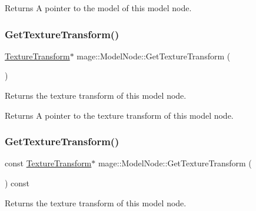 \begin{DoxyReturn}{Returns}
A pointer to the model of this model node. 
\end{DoxyReturn}
\hypertarget{classmage_1_1_model_node_aa5b732d1ad0f3d2ff8549731708fd63c}{}\label{classmage_1_1_model_node_aa5b732d1ad0f3d2ff8549731708fd63c} 
\subsubsection{\texorpdfstring{Get\+Texture\+Transform()}{GetTextureTransform()}\hspace{0.1cm}{\footnotesize\ttfamily [1/2]}}
{\footnotesize\ttfamily \hyperlink{classmage_1_1_texture_transform}{Texture\+Transform}$\ast$ mage\+::\+Model\+Node\+::\+Get\+Texture\+Transform (\begin{DoxyParamCaption}{ }\end{DoxyParamCaption})\hspace{0.3cm}{\ttfamily [noexcept]}}

Returns the texture transform of this model node.

\begin{DoxyReturn}{Returns}
A pointer to the texture transform of this model node. 
\end{DoxyReturn}
\hypertarget{classmage_1_1_model_node_a3686306f587abaa353450c45dd508dc4}{}\label{classmage_1_1_model_node_a3686306f587abaa353450c45dd508dc4} 
\subsubsection{\texorpdfstring{Get\+Texture\+Transform()}{GetTextureTransform()}\hspace{0.1cm}{\footnotesize\ttfamily [2/2]}}
{\footnotesize\ttfamily const \hyperlink{classmage_1_1_texture_transform}{Texture\+Transform}$\ast$ mage\+::\+Model\+Node\+::\+Get\+Texture\+Transform (\begin{DoxyParamCaption}{ }\end{DoxyParamCaption}) const\hspace{0.3cm}{\ttfamily [noexcept]}}

Returns the texture transform of this model node.

